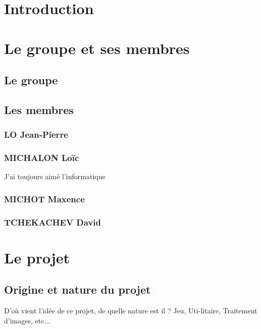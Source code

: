 \documentclass{article}
\title{
\textbf{\begin{center}\Huge Cahier des charges \end{center}}
\textrm{ \underline{Groupe} : Sépanou}}
\author{LO Jean-Pierre | MICHALON Loïc\and MICHOT Maxence | TCHEKACHEV David}
\date{Janvier 2021}
\begin{document}
\maketitle

\pagebreak

\renewcommand*\contentsname{\textbf{\Huge Sommaire \newline}}
\large \tableofcontents

\pagebreak

\section{Introduction}

\pagebreak

\section{Le groupe et ses membres}
\subsection{Le groupe}

\subsection{Les membres}
\subsubsection{LO Jean-Pierre}

\subsubsection{MICHALON Loïc}

J'ai toujours aimé l'informatique

\subsubsection{MICHOT Maxence}
\subsubsection{TCHEKACHEV David}
\pagebreak

\section{Le projet}
\subsection{Origine et nature du projet}
D’où vient l’idée de ce projet, de quelle nature est il ? Jeu, Uti-litaire, Traitement d’images, etc...
\end{document}
